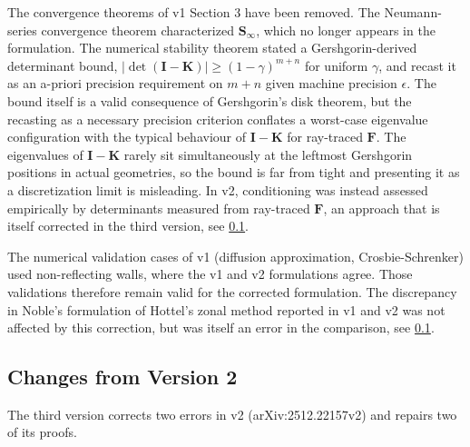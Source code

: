 \documentclass[preprint,1p,times]{elsarticle}
\theoremstyle{plain}
\theoremstyle{definition}
\theoremstyle{remark}
\begin{document}
The convergence theorems of v1 Section 3 have been removed. The Neumann-series convergence theorem characterized $\mathbf{S}_\infty$, which no longer appears in the formulation. The numerical stability theorem stated a Gershgorin-derived determinant bound, $|\det(\mathbf{I}-\mathbf{K})| \geq (1-\gamma)^{m+n}$ for uniform $\gamma$, and recast it as an a-priori precision requirement on $m+n$ given machine precision $\epsilon$. The bound itself is a valid consequence of Gershgorin's disk theorem, but the recasting as a necessary precision criterion conflates a worst-case eigenvalue configuration with the typical behaviour of $\mathbf{I}-\mathbf{K}$ for ray-traced $\mathbf{F}$. The eigenvalues of $\mathbf{I}-\mathbf{K}$ rarely sit simultaneously at the leftmost Gershgorin positions in actual geometries, so the bound is far from tight and presenting it as a discretization limit is misleading. In v2, conditioning was instead assessed empirically by determinants measured from ray-traced $\mathbf{F}$, an approach that is itself corrected in the third version, see \ref{app:errata_v2}.

The numerical validation cases of v1 (diffusion approximation, Crosbie-Schrenker) used non-reflecting walls, where the v1 and v2 formulations agree. Those validations therefore remain valid for the corrected formulation. The discrepancy in Noble's formulation of Hottel's zonal method reported in v1 and v2 was not affected by this correction, but was itself an error in the comparison, see \ref{app:errata_v2}.

\subsection{Changes from Version 2}
\label{app:errata_v2}

The third version corrects two errors in v2 (arXiv:2512.22157v2) and repairs two of its proofs.
\end{document}
